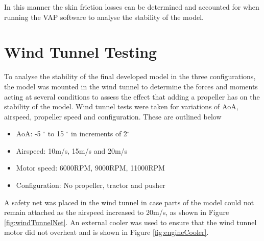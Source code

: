 In this manner the skin friction losses can be determined and accounted for when running the VAP software to analyse the stability of the model. 

\section{Wind Tunnel Testing}
To analyse the stability of the final developed model in the three configurations, the model was mounted in the wind tunnel to determine the forces and moments acting at several conditions to assess the effect that adding a propeller has on the stability of the model. Wind tunnel tests were taken for variations of \acrshort{AoA}, airspeed, propeller speed and configuration. These are outlined below

\begin{itemize}
    \item \acrshort{AoA}: -5 $^{\circ}$ to 15 $^{\circ}$ in increments of 2$^{\circ}$
    \item Airspeed: 10m/s, 15m/s and 20m/s
    \item Motor speed: 6000RPM, 9000RPM, 11000RPM
    \item Configuration: No propeller, tractor and pusher
\end{itemize}


A safety net was placed in the wind tunnel in case parts of the model could not remain attached as the airspeed increased to 20m/s, as shown in Figure \ref{fig:windTunnelNet}. An external cooler was used to ensure that the wind tunnel motor did not overheat and is shown in Figure \ref{fig:engineCooler}.


    


